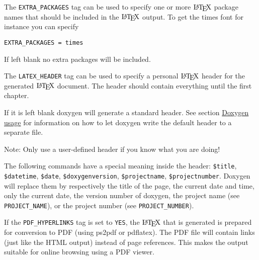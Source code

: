 \begin{description}
\label{config_cfg_extra_packages}
\hypertarget{config_cfg_extra_packages}{}
 \item[{\tt EXTRA\_\-PACKAGES} ] The {\tt EXTRA\_\-PACKAGES} tag can be used to specify one or more $\mbox{\LaTeX}$ package names that should be included in the $\mbox{\LaTeX}$ output. To get the times font for instance you can specify 

\footnotesize\begin{verbatim}
EXTRA_PACKAGES = times
\end{verbatim}
\normalsize
 If left blank no extra packages will be included.

\label{config_cfg_latex_header}
\hypertarget{config_cfg_latex_header}{}
 \item[{\tt LATEX\_\-HEADER} ] The {\tt LATEX\_\-HEADER} tag can be used to specify a personal $\mbox{\LaTeX}$ header for the generated $\mbox{\LaTeX}$ document. The header should contain everything until the first chapter.

If it is left blank doxygen will generate a standard header. See section \hyperlink{doxygen_usage}{Doxygen usage} for information on how to let doxygen write the default header to a separate file.

\begin{Desc}
\item[Note: ]Only use a user-defined header if you know what you are doing!\end{Desc}
The following commands have a special meaning inside the header: {\tt \$title}, {\tt \$datetime}, {\tt \$date}, {\tt \$doxygenversion}, {\tt \$projectname}, {\tt \$projectnumber}. Doxygen will replace them by respectively the title of the page, the current date and time, only the current date, the version number of doxygen, the project name (see {\tt PROJECT\_\-NAME}), or the project number (see {\tt PROJECT\_\-NUMBER}).

\label{config_cfg_pdf_hyperlinks}
\hypertarget{config_cfg_pdf_hyperlinks}{}
 \item[{\tt PDF\_\-HYPERLINKS} ]

If the {\tt PDF\_\-HYPERLINKS} tag is set to {\tt YES}, the $\mbox{\LaTeX}$ that is generated is prepared for conversion to PDF (using ps2pdf or pdflatex). The PDF file will contain links (just like the HTML output) instead of page references. This makes the output suitable for online browsing using a PDF viewer.


\end{description}
